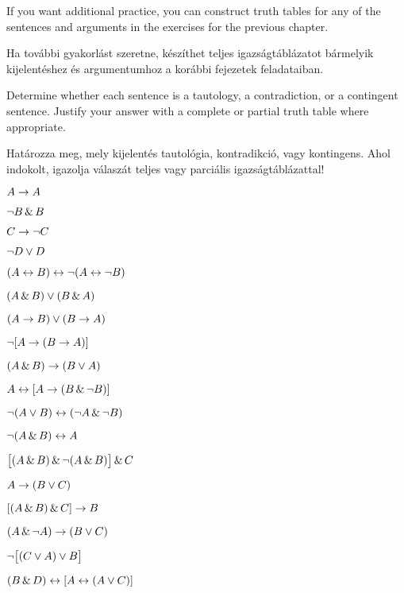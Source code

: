  








\practiceproblems
If you want additional practice, you can construct truth tables for any of the sentences and arguments in the exercises for the previous chapter.

\practiceproblems
Ha további gyakorlást szeretne, készíthet teljes igazságtáblázatot bármelyik kijelentéshez és argumentumhoz a korábbi fejezetek feladataiban.

\solutions
\problempart
\label{pr.TT.TTorC}
Determine whether each sentence is a tautology, a contradiction, or a contingent sentence. Justify your answer with a complete or partial truth table where appropriate.

\solutions
\problempart
\label{pr.TT.TTorC}
Határozza meg, mely kijelentés tautológia, kontradikció, vagy kontingens. Ahol indokolt, igazolja válaszát teljes vagy parciális igazságtáblázattal!

\begin{earg}
\item $A \rightarrow A$ %
\item $\neg B \,\&\, B$ %
\item $C \rightarrow\neg C$ %
\item $\neg D \vee D$ %
\item $(A \leftrightarrow B) \leftrightarrow \neg(A\leftrightarrow \neg B)$ %
\item $(A\,\&\, B) \vee (B\,\&\, A)$ %
\item $(A \rightarrow B) \vee (B \rightarrow A)$ %
\item $\neg[A \rightarrow (B \rightarrow A)]$ %
\item $(A \,\&\, B) \rightarrow (B \vee A)$  %
\item $A \leftrightarrow [A \rightarrow (B \,\&\, \neg B)]$ %
\item $\neg(A \vee B) \leftrightarrow (\neg A \,\&\, \neg B)$ %
\item $\neg(A\,\&\, B) \leftrightarrow A$ %
\item $\bigl[(A\,\&\, B) \,\&\,\neg(A\,\&\, B)\bigr] \,\&\, C$ %
\item $A\rightarrow(B\vee C)$ %
\item $[(A \,\&\, B) \,\&\, C] \rightarrow B$ %
\item $(A \,\&\,\neg A) \rightarrow (B \vee C)$ %
\item $\neg\bigl[(C\vee A) \vee B\bigr]$ %
\item $(B\,\&\, D) \leftrightarrow [A \leftrightarrow(A \vee C)]$%
\end{earg}


